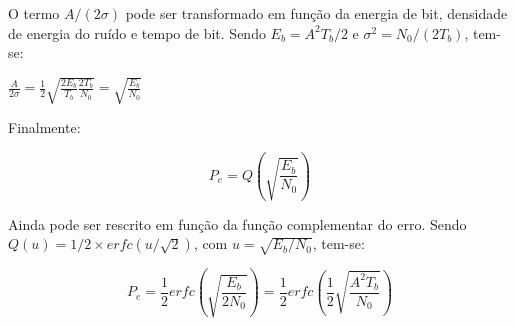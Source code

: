 O termo $A/(2\sigma)$ pode ser transformado em função da energia de bit, densidade de energia do ruído e tempo de bit. Sendo $E_b = A^2T_b/2$ e $\sigma^2 = N_0/(2T_b)$, tem-se:

\begin{center}
    $\frac{A}{2\sigma} = \frac{1}{2} \sqrt{\frac{2E_b}{T_b}\frac{2T_b}{N_0}} = \sqrt{\frac{E_b}{N_0}}$
\end{center}

Finalmente:

\begin{equation} \label{q06:10}
    P_e= Q\left(\sqrt{\frac{E_b}{N_0}}\right) 
\end{equation}

Ainda pode ser rescrito em função da função complementar do erro. Sendo $Q(u) = 1/2 \times erfc(u/\sqrt{2})$, com $u = \sqrt{E_b/N_0}$, tem-se:

\begin{equation} \label{q06:11}
    P_e=  \frac{1}{2} erfc\left(\sqrt{\frac{E_b}{2N_0}}\right) = \frac{1}{2} erfc\left(\frac{1}{2}\sqrt{\frac{A^2T_b}{N_0}}\right)
\end{equation}


\newpage










\begin{comment}
A variância de saída do filtro casado é dada por:

\begin{center} 
    $\sigma^2_Y = \int_{-\infty}^{\infty} S_Y(f)|H(f)|^2 df$
\end{center}

A densidade espectral de potência para o ruído é constante em $N_0/2$ e o filtro $H(f)$ é casado com o sinal, logo a integral infinita do seu espectro de amplitude ao quadrado será a energia de um símbolo $E_b$, assim a variância da variável aleatória $Y$ será:

\begin{center}
    $\sigma^2 = \frac{N_0A^2T_b}{2}$
\end{center}

Isolando $A/(2\sigma)$:

\begin{center}
    $\frac{A}{2\sigma} = \sqrt{\frac{1}{2N_0T_b}}$
\end{center}

Finalmente:

\begin{equation} \label{q06:10}
    P_e= Q(\frac{A}{2\sigma}) = \frac{1}{\sqrt{2\pi}} \int_{A/(2\sigma)}^{\infty}  e^{-z^2/2}dz
\end{equation}
\end{comment}
